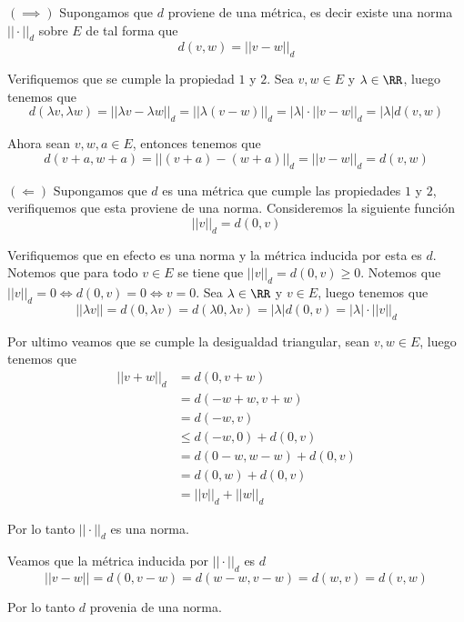\documentclass[a4paper,oneside,10.5pt]{USMArt}
\begin{document}
\begin{sol}
  $(\implies)$ Supongamos que $d$ proviene de una métrica, es decir existe una norma $||\cdot||_{d}$ sobre $E$
  de tal forma que
  \begin{equation*}
    d(v, w) = ||v - w||_{d}
  \end{equation*}

  Verifiquemos que se cumple la propiedad $1$ y $2$. Sea $v, w \in E$ y $\lambda \in \RR$, luego tenemos que
  \begin{equation*}
    d(\lambda v, \lambda w) = ||\lambda v - \lambda w||_{d} = ||\lambda(v - w)||_{d} = |\lambda| \cdot ||v - w||_{d} = |\lambda| d(v, w)
  \end{equation*}

  Ahora sean $v, w, a \in E$, entonces tenemos que
  \begin{equation*}
    d(v + a, w + a) = ||(v + a) - (w + a)||_{d} = ||v - w||_{d} = d(v, w)
  \end{equation*}

  $(\Longleftarrow)$ Supongamos que $d$ es una métrica que cumple las propiedades $1$ y $2$, verifiquemos que esta
  proviene de una norma. Consideremos la siguiente funci\'on
  \begin{equation*}
    ||v||_{d} = d(0, v)
  \end{equation*}

  Verifiquemos que en efecto es una norma y la métrica inducida por esta es $d$. Notemos que para todo $v \in E$ se tiene que $||v||_{d} = d(0, v) \geq 0$. Notemos que $||v||_{d} = 0 \iff d(0, v) = 0 \iff v = 0$.
  Sea $\lambda \in \RR$ y $v \in E$, luego tenemos que
  \begin{equation*}
    ||\lambda v|| = d(0, \lambda v) = d(\lambda 0, \lambda v) = |\lambda| d(0, v) = |\lambda| \cdot ||v||_{d}
  \end{equation*}

  Por ultimo veamos que se cumple la desigualdad triangular, sean $v, w \in E$, luego tenemos que
  \begin{align*}
    ||v + w||_{d} &= d(0, v + w)\\
                  &= d(-w + w, v + w)\\
                  &= d(-w, v)\\
                  &\leq d(-w, 0) + d(0, v)\\
                  &= d(0 - w, w - w) + d(0, v)\\
                  &=  d(0, w) + d(0, v)\\
                  &= ||v||_{d} + ||w||_{d}
  \end{align*}

  Por lo tanto $|| \cdot ||_{d}$ es una norma.

  Veamos que la métrica inducida por $|| \cdot ||_{d}$ es $d$
  \begin{equation*}
    ||v - w|| = d(0, v - w) = d(w - w, v - w) = d(w, v) = d(v, w)
  \end{equation*}

  Por lo tanto $d$ provenia de una norma.
\end{sol}
\end{document}
